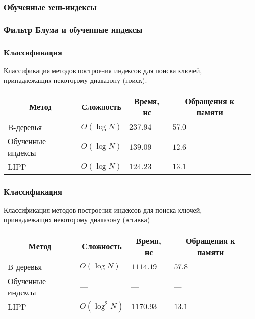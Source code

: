 \documentclass{bmstu-pr}
\begin{document}
\begin{frame}
    \frametitle{Обученные хеш-индексы}
    \centering{}
\end{frame}

\begin{frame}
    \frametitle{Фильтр Блума и обученные индексы}
\end{frame}

\begin{frame}
    \frametitle{Классификация}

Классификация методов построения индексов для поиска ключей, принадлежащих
некоторому диапазону (поиск).
{
\captionsetup{format=hang,justification=raggedright,
              singlelinecheck=off,width=17cm}
\begin{longtable}[Hc]{|p{8cm}|p{2cm}|p{2cm}|p{4.8cm}|}
    \hline
    \multicolumn{1}{|c|}{\textbf{Метод}} &
    \multicolumn{1}{c|}{\textbf{Сложность}} &
    \multicolumn{1}{c|}{\textbf{Время, нс}} &
    \multicolumn{1}{c|}{\parbox{4.8cm}{\vspace{2mm}\centering\textbf{Обращения к
    памяти}}}\\[2.5ex]
    \hline
    B-деревья & $O(\log N)$
    & $237.94$
    & $57.0$\\
    \hline
    Обученные индексы & $O(\log N)$
    & $139.09$
    & $12.6$\\
    \hline
    LIPP & $O(\log N)$
         & \color{white}$1$\color{black}$24.23$
    & \color{white}$1$\color{black}$3.1$\\
    \hline
\end{longtable}
}

\end{frame}

\begin{frame}
    \frametitle{Классификация}
Классификация методов построения индексов для поиска ключей,
принадлежащих некоторому диапазону (вставка)
{
\captionsetup{format=hang,justification=raggedright,
              singlelinecheck=off,width=16.8cm}
\begin{longtable}[Hc]{|p{8cm}|p{2cm}|p{2cm}|p{4.8cm}|}
    \hline
    \multicolumn{1}{|c|}{\textbf{Метод}} &
    \multicolumn{1}{c|}{\textbf{Сложность}} &
    \multicolumn{1}{c|}{\textbf{Время, нс}} &
    \multicolumn{1}{c|}{\parbox{4.8cm}{\vspace{2mm}\centering\textbf{Обращения к
    памяти}}}\\[2.5ex]
    \hline
    B-деревья
    & $O(\log N)$
    & $1114.19$
    & $57.8$\\
    \hline
    Обученные индексы
    & ---
    & ---
    & ---\\
    \hline
    LIPP
    & $O(\log^2 N)$
    & \color{white}$11$\color{black}$70.93$
    & \color{white}$1$\color{black}$3.1$\\
    \hline
\end{longtable}
}
\end{frame}
\end{document}
